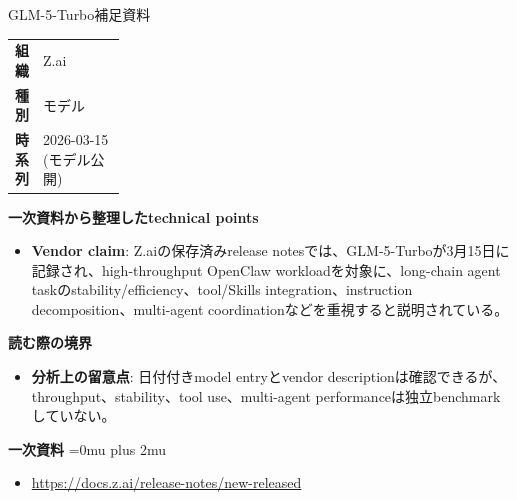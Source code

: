 \begin{technicalnote}{GLM-5-Turbo}{補足資料}
\begingroup
\begin{tabularx}{\linewidth}{@{}>{\bfseries}p{0.22\linewidth}X@{}}
組織 & Z.ai \\
種別 & モデル \\
時系列 & 2026-03-15 (モデル公開) \\
\end{tabularx}
\smallskip
{\bfseries 一次資料から整理したtechnical points}
\begin{itemize}[leftmargin=1.5em,itemsep=0.35em]
\item \textbf{Vendor claim}: Z.aiの保存済みrelease notesでは、GLM-5-Turboが3月15日に記録され、high-throughput OpenClaw workloadを対象に、long-chain agent taskのstability/efficiency、tool/Skills integration、instruction decomposition、multi-agent coordinationなどを重視すると説明されている。
\end{itemize}
\begin{minipage}{\linewidth}
{\bfseries 読む際の境界}
\begin{itemize}[leftmargin=1.5em,itemsep=0.35em]
\item \textbf{分析上の留意点}: 日付付きmodel entryとvendor descriptionは確認できるが、throughput、stability、tool use、multi-agent performanceは独立benchmarkしていない。
\end{itemize}
\begin{samepage}
{\bfseries 一次資料}
\begingroup\sloppy
\Urlmuskip=0mu plus 2mu\relax
\begin{itemize}[leftmargin=1.5em,itemsep=0.25em]
\item {\scriptsize\url{https://docs.z.ai/release-notes/new-released}}
\end{itemize}
\endgroup
\end{samepage}
\end{minipage}
\endgroup
\end{technicalnote}
\medskip

